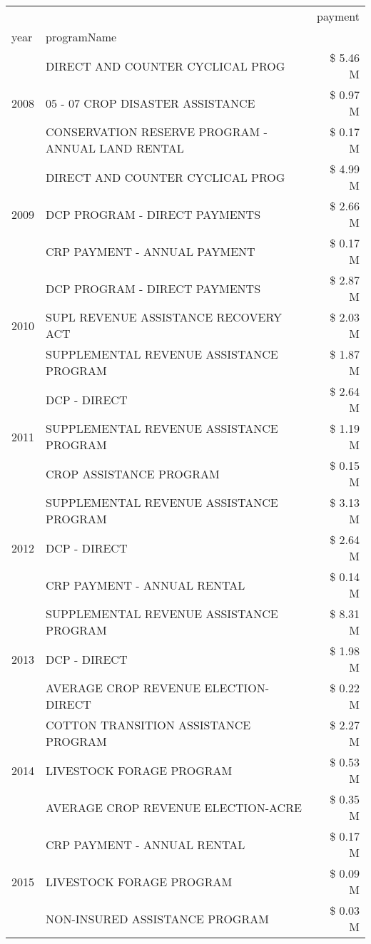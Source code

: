 \begin{tabular}{llr}
\toprule
 &  & payment \\
year & programName &  \\
\midrule
\multirow[t]{3}{*}{2008} & DIRECT AND COUNTER CYCLICAL PROG & \$ 5.46 M \\
 & 05 - 07 CROP DISASTER ASSISTANCE & \$ 0.97 M \\
 & CONSERVATION RESERVE PROGRAM - ANNUAL LAND RENTAL & \$ 0.17 M \\
\cline{1-3}
\multirow[t]{3}{*}{2009} & DIRECT AND COUNTER CYCLICAL PROG & \$ 4.99 M \\
 & DCP PROGRAM - DIRECT PAYMENTS & \$ 2.66 M \\
 & CRP PAYMENT - ANNUAL PAYMENT & \$ 0.17 M \\
\cline{1-3}
\multirow[t]{3}{*}{2010} & DCP PROGRAM - DIRECT PAYMENTS & \$ 2.87 M \\
 & SUPL REVENUE ASSISTANCE RECOVERY ACT & \$ 2.03 M \\
 & SUPPLEMENTAL REVENUE ASSISTANCE PROGRAM & \$ 1.87 M \\
\cline{1-3}
\multirow[t]{3}{*}{2011} & DCP - DIRECT & \$ 2.64 M \\
 & SUPPLEMENTAL REVENUE ASSISTANCE PROGRAM & \$ 1.19 M \\
 & CROP ASSISTANCE PROGRAM & \$ 0.15 M \\
\cline{1-3}
\multirow[t]{3}{*}{2012} & SUPPLEMENTAL REVENUE ASSISTANCE PROGRAM & \$ 3.13 M \\
 & DCP - DIRECT & \$ 2.64 M \\
 & CRP PAYMENT - ANNUAL RENTAL & \$ 0.14 M \\
\cline{1-3}
\multirow[t]{3}{*}{2013} & SUPPLEMENTAL REVENUE ASSISTANCE PROGRAM & \$ 8.31 M \\
 & DCP - DIRECT & \$ 1.98 M \\
 & AVERAGE CROP REVENUE ELECTION-DIRECT & \$ 0.22 M \\
\cline{1-3}
\multirow[t]{3}{*}{2014} & COTTON TRANSITION ASSISTANCE PROGRAM & \$ 2.27 M \\
 & LIVESTOCK FORAGE PROGRAM & \$ 0.53 M \\
 & AVERAGE CROP REVENUE ELECTION-ACRE & \$ 0.35 M \\
\cline{1-3}
\multirow[t]{3}{*}{2015} & CRP PAYMENT - ANNUAL RENTAL & \$ 0.17 M \\
 & LIVESTOCK FORAGE PROGRAM & \$ 0.09 M \\
 & NON-INSURED ASSISTANCE PROGRAM & \$ 0.03 M \\

\end{tabular}
